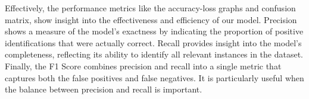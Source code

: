 \noindent Effectively, the performance metrics like the accuracy-loss graphs and confusion matrix, show insight into the effectiveness and efficiency of our model. Precision shows a measure of the model's exactness by indicating the proportion of positive identifications that were actually correct. Recall provides insight into the model's completeness, reflecting its ability to identify all relevant instances in the dataset. Finally, the F1 Score combines precision and recall into a single metric that captures both the false positives and false negatives. It is particularly useful when the balance between precision and recall is important.


\renewcommand{\footrulewidth}{0.4pt}